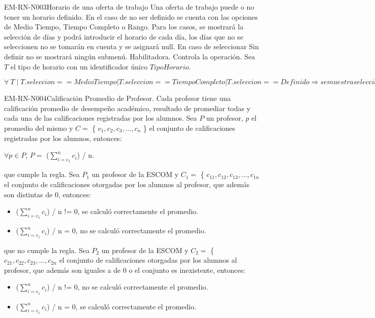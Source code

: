 \begin{BussinesRule}{EM-RN-N003}{Horario de una oferta de trabajo}
	\BRitem[Descripción:] 
	Una oferta de trabajo puede o no tener un horario definido. En el caso de no ser definido se cuenta con las opciones de Medio Tiempo, Tiempo Completo o Rango. Para los casos, se mostrará la selección de días y podrá introducir el horario de cada día, los días que no se seleccionen no se tomarán en cuenta y se asignará null. En caso de seleccionar Sin definir no se mostrará ningún submenú.
	\BRitem[Tipo:] Habilitadora.
	\BRitem[Nivel:] Controla la operación.
	\BRitem[Sentencia: ] Sea $T$  el tipo de horario con un identificador único $TipoHorario$.
	\begin{center}
		$\forall \: T  \mid T.seleccion == Medio Tiempo | T.seleccion == Tiempo Completo | T.seleccion == Definido  \Rightarrow se muestra seleccion de dias.$
	\end{center}
\end{BussinesRule}

\begin{BussinesRule}{EM-RN-N004}{Calificación Promedio de Profesor.} 
	\BRitem[Descripción:] Cada profesor tiene una calificación promedio de desempeño académico, resultado de promediar todas y cada una de las calificaciones registradas por los alumnos.
	\BRitem[Sentencia : ] Sea $P$ un profesor, $p$ el promedio del mismo y $C =$ \{ $c_{1},c_{2},c_{3},...,c_{n}$  \} el conjunto de calificaciones registradas por los alumnos, entonces:
	\begin{center}
		$\forall p \in P$, $P=$ ($ \sum_{i=c_1}^{n}c_{i} $) / n.
	\end{center}
	 que cumple la regla.
		Sea $P_{1}$ un profesor de la ESCOM y $C_{1} =$ \{ $c_{11},c_{12},c_{13},...,c_{1n}$ el conjunto de calificaciones otorgadas por los alumnos al profesor, que además son distintas de 0, entonces:
		\begin{itemize}
			\item ($ \sum_{i=c_1}^{n}c_{i} $) / n != 0, se calculó correctamente el promedio.
			\item ($ \sum_{i=c_1}^{n}c_{i} $) / n = 0, no se calculó correctamente el promedio.
		\end{itemize}
	 que no cumple la regla.
		Sea $P_{2}$ un profesor de la ESCOM y $C_{2} =$ \{ $c_{21},c_{22},c_{23},...,c_{2n}$ el conjunto de calificaciones otorgadas por los alumnos al profesor, que además son iguales a de 0 o el conjunto es inexistente, entonces:
		\begin{itemize}
			\item ($ \sum_{i=c_1}^{n}c_{i} $) / n != 0, no se calculó correctamente el promedio.
			\item ($ \sum_{i=c_1}^{n}c_{i} $) / n = 0, se calculó correctamente el promedio.
		\end{itemize}
\end{BussinesRule}

